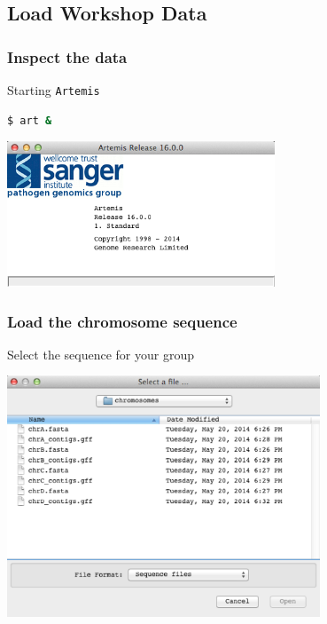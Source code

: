%

\subsection{Load Workshop Data}
\begin{frame}[fragile]
  \frametitle{Inspect the data}
  Starting \texttt{Artemis}
\begin{lstlisting}[language=bash]
$ art &
\end{lstlisting}
  \begin{center}
    \includegraphics[width=0.6\textwidth]{images/artemis_splash} 
  \end{center}
\end{frame}
    
\begin{frame}
  \frametitle{Load the chromosome sequence}
  Select the sequence for your group
  \begin{center}
    \includegraphics[width=0.7\textwidth]{images/artemis_files} 
  \end{center}
\end{frame}
    
